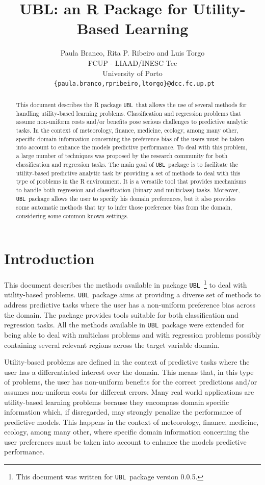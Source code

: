 \documentclass[10pt,a4paper]{article}\usepackage[]{graphicx}\usepackage[]{color}
\author{Paula Branco, Rita P. Ribeiro and Luis Torgo\\FCUP - LIAAD/INESC Tec\\University of Porto\\
  \texttt{ \{paula.branco,rpribeiro,ltorgo\}@dcc.fc.up.pt}}
\title{UBL: an R Package for Utility-Based Learning}
\newcommand{\pUBL}{package \texttt{UBL}\ }
\newcommand{\UBLp}{\texttt{UBL}\ package  }
\newcommand{\version}{0.0.5}
\begin{document}
\maketitle


\begin{abstract}
  
  This document describes the R \pUBL that allows the use of several methods for handling utility-based learning problems. Classification and regression problems that assume non-uniform costs and/or benefits pose serious challenges to predictive analytic tasks. In the context of meteorology, finance, medicine, ecology, among many other, specific domain information concerning the preference bias of the users must be taken into account to enhance the models predictive performance. To deal with this problem, a large number of techniques was proposed by the research community for both classification and regression tasks. 
  The main goal of \UBLp is to facilitate the utility-based predictive analytic task by providing a set of methods to deal with this type of problems in the R environment. It is a versatile tool that provides mechanisms to handle both regression and classification (binary and multiclass) tasks. Moreover, \UBLp allows the user to specify his domain preferences, but it also provides some automatic methods that try to infer those preference bias from the domain, considering some common known settings. 

\end{abstract}

\section{Introduction}

This document describes the methods available in \pUBL \footnote{This document was written for \UBLp version \version.} to deal with utility-based problems. \UBLp aims at providing a diverse set of methods to address predictive tasks where the user has a non-uniform preference bias across the domain. The package provides tools suitable for both classification and regression tasks. All the methods available in \UBLp were extended for being able to deal with multiclass problems and with regression problems possibly containing several relevant regions across the target variable domain. 


Utility-based problems are defined in the context of predictive tasks where the user has a differentiated interest over the domain. This means that, in this type of problems, the user has non-uniform benefits for the correct predictions and/or assumes non-uniform costs for different errors. Many real world applications are utility-based learning problems because they encompass domain specific information which, if disregarded, may strongly penalize the performance of predictive models. This happens in the context of meteorology, finance, medicine, ecology, among many other, where specific domain information concerning the user preferences must be taken into account to enhance the models predictive performance.
\end{document}
